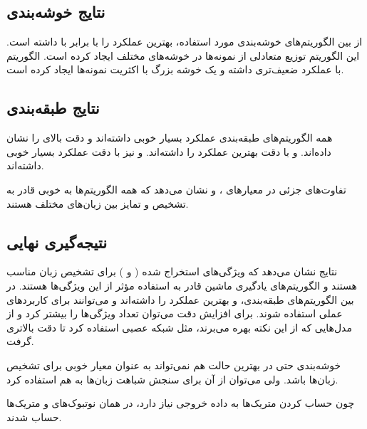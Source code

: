 \documentclass[12pt]{article}
\begin{document}
\subsection{نتایج خوشه‌بندی}
از بین الگوریتم‌های خوشه‌بندی مورد استفاده،  بهترین عملکرد را با  برابر با  داشته است. این الگوریتم توزیع متعادلی از نمونه‌ها در خوشه‌های مختلف ایجاد کرده است. الگوریتم  با  عملکرد ضعیف‌تری داشته و یک خوشه بزرگ با اکثریت نمونه‌ها ایجاد کرده است.

\subsection{نتایج طبقه‌بندی}
همه الگوریتم‌های طبقه‌بندی عملکرد بسیار خوبی داشته‌اند و دقت بالای  را نشان داده‌اند.  و  با دقت  بهترین عملکرد را داشته‌اند.  و  نیز با دقت  عملکرد بسیار خوبی داشته‌اند.

تفاوت‌های جزئی در معیارهای ،  و  نشان می‌دهد که همه الگوریتم‌ها به خوبی قادر به تشخیص و تمایز بین زبان‌های مختلف هستند.

\subsection{نتیجه‌گیری نهایی}
نتایج نشان می‌دهد که ویژگی‌های استخراج شده ( و ) برای تشخیص زبان مناسب هستند و الگوریتم‌های یادگیری ماشین قادر به استفاده مؤثر از این ویژگی‌ها هستند. در بین الگوریتم‌های طبقه‌بندی،  و  بهترین عملکرد را داشته‌اند و می‌توانند برای کاربردهای عملی استفاده شوند. برای افزایش دقت می‌توان تعداد ویژگی‌ها را بیشتر کرد و از مدل‌هایی که از این نکته بهره می‌برند، مثل شبکه عصبی استفاده کرد تا دقت بالاتری گرفت.

خوشه‌بندی حتی در بهترین حالت هم نمی‌تواند به عنوان معیار خوبی برای تشخیص زبان‌ها باشد. ولی می‌توان از آن برای سنجش شباهت زبان‌ها به هم استفاده کرد. 
	
	چون حساب کردن متریک‌ها به داده خروجی نیاز دارد، در همان نوتبوک‌های 
	و
	متریک‌ها حساب شدند.
\end{document}
